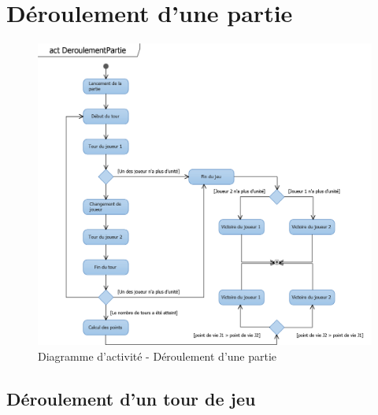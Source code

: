 \documentclass[a4paper,11pt]{article}
\begin{document}
\section{Déroulement d'une partie}
\vspace*{0.5cm}
\lipsum[1]
\vspace*{1cm}
\begin{figure}[ht!]
\includegraphics{actDeroulementPartie.png}
\caption{Diagramme d'activité - Déroulement d'une partie}
\label{fig:actpartie}
\end{figure}
\newpage



\subsection{Déroulement d'un tour de jeu}
\vspace*{0.5cm}
\lipsum[1]
\vspace*{0.5cm}
\end{document}
